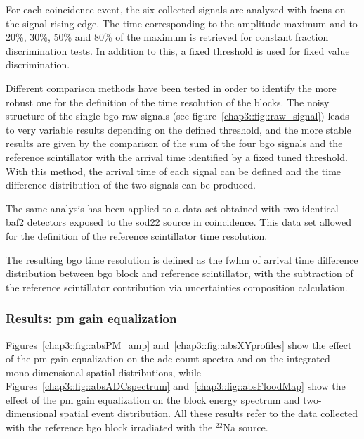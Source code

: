 For each coincidence event, the six collected signals are analyzed with focus on the signal rising edge. The time corresponding to the amplitude maximum and to 20\%, 30\%, 50\% and 80\% of the maximum is retrieved for constant fraction discrimination tests. In addition to this, a fixed threshold is used for fixed value discrimination.

Different comparison methods have been tested in order to identify the more robust one for the definition of the time resolution of the blocks. The noisy structure of the single \gls{bgo} raw signals (see figure~\ref{chap3::fig::raw_signal})  leads to very variable results depending on the defined threshold, and the more stable results are given by the comparison of the sum of the four \gls{bgo} signals and the reference scintillator with the arrival time identified by a fixed tuned threshold. With this method, the arrival time of each signal can be defined and the time difference distribution of the two signals can be produced.

The same analysis has been applied to a data set obtained with two identical \gls{baf2} detectors exposed to the \gls{sod22} source in coincidence. This data set allowed for the definition of the reference scintillator time resolution.

The resulting \gls{bgo} time resolution is defined as the \gls{fwhm} of arrival time difference distribution between \gls{bgo} block and reference scintillator, with the subtraction of the reference scintillator contribution via uncertainties composition calculation.

\subsubsection{Results: \gls{pm} gain equalization}\label{chap3::subsubsec::absPMgainCal}
Figures~\ref{chap3::fig::absPM_amp} and~\ref{chap3::fig::absXYprofiles} show the effect of the \gls{pm} gain equalization on the \gls{adc} count spectra and on the integrated mono-dimensional spatial distributions, while Figures~\ref{chap3::fig::absADCspectrum} and~\ref{chap3::fig::absFloodMap}  show the effect of the \gls{pm} gain equalization on the block energy spectrum and two-dimensional spatial event distribution. All these results refer to the data collected with the reference \gls{bgo} block irradiated with the $^{22}$Na source.

